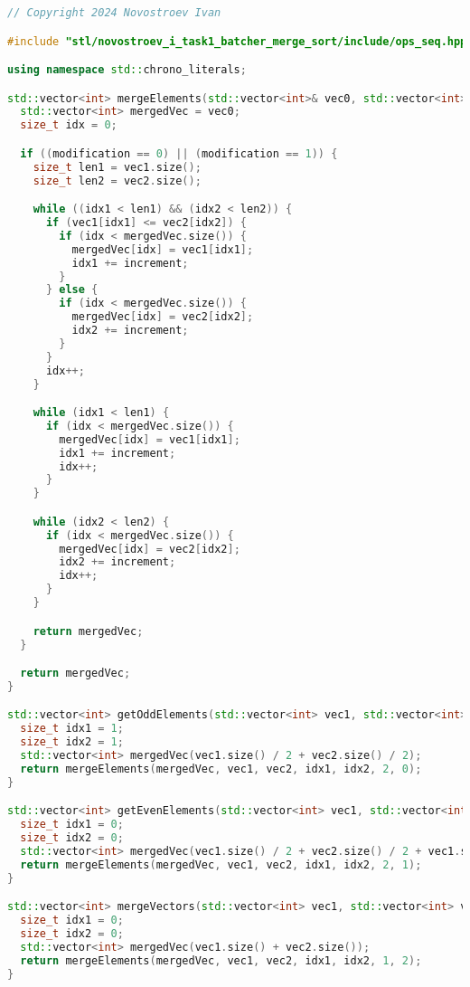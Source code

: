 \documentclass{report}
\begin{document}
\begin{lstlisting}[language=C++,caption=Последовательная версия]
// Copyright 2024 Novostroev Ivan

#include "stl/novostroev_i_task1_batcher_merge_sort/include/ops_seq.hpp"

using namespace std::chrono_literals;

std::vector<int> mergeElements(std::vector<int>& vec0, std::vector<int>& vec1, std::vector<int>& vec2, size_t idx1, size_t idx2, size_t increment, int modification) {
  std::vector<int> mergedVec = vec0;
  size_t idx = 0;

  if ((modification == 0) || (modification == 1)) {
    size_t len1 = vec1.size();
    size_t len2 = vec2.size();

    while ((idx1 < len1) && (idx2 < len2)) {
      if (vec1[idx1] <= vec2[idx2]) {
        if (idx < mergedVec.size()) {
          mergedVec[idx] = vec1[idx1];
          idx1 += increment;
        }
      } else {
        if (idx < mergedVec.size()) {
          mergedVec[idx] = vec2[idx2];
          idx2 += increment;
        }
      }
      idx++;
    }

    while (idx1 < len1) {
      if (idx < mergedVec.size()) {
        mergedVec[idx] = vec1[idx1];
        idx1 += increment;
        idx++;
      }
    }

    while (idx2 < len2) {
      if (idx < mergedVec.size()) {
        mergedVec[idx] = vec2[idx2];
        idx2 += increment;
        idx++;
      }
    }

    return mergedVec;
  }

  return mergedVec;
}

std::vector<int> getOddElements(std::vector<int> vec1, std::vector<int> vec2) {
  size_t idx1 = 1;
  size_t idx2 = 1;
  std::vector<int> mergedVec(vec1.size() / 2 + vec2.size() / 2);
  return mergeElements(mergedVec, vec1, vec2, idx1, idx2, 2, 0);
}

std::vector<int> getEvenElements(std::vector<int> vec1, std::vector<int> vec2) {
  size_t idx1 = 0;
  size_t idx2 = 0;
  std::vector<int> mergedVec(vec1.size() / 2 + vec2.size() / 2 + vec1.size() % 2 + vec2.size() % 2);
  return mergeElements(mergedVec, vec1, vec2, idx1, idx2, 2, 1);
}

std::vector<int> mergeVectors(std::vector<int> vec1, std::vector<int> vec2) {
  size_t idx1 = 0;
  size_t idx2 = 0;
  std::vector<int> mergedVec(vec1.size() + vec2.size());
  return mergeElements(mergedVec, vec1, vec2, idx1, idx2, 1, 2);
}


\end{lstlisting}
\end{document}
